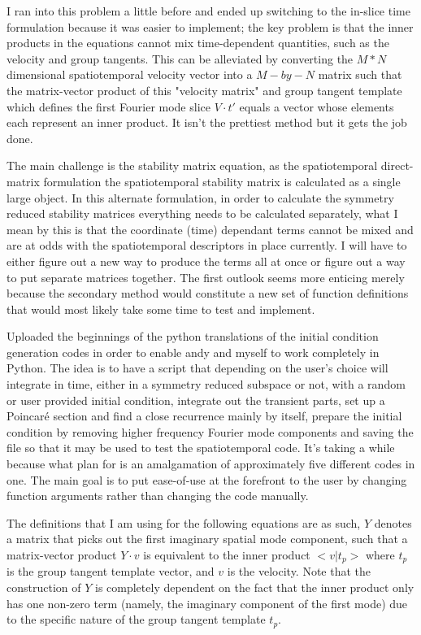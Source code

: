 I ran into this problem a little before and ended up switching to the in-slice time formulation
because it was easier to implement; the key problem is that the inner products in the equations
cannot mix time-dependent quantities, such as the velocity and group tangents. This can be
alleviated by converting the $M*N$ dimensional spatiotemporal velocity vector into a $M-by-N$ matrix
such that the matrix-vector product of this "velocity matrix" and group tangent template which
defines the first Fourier mode slice $V \cdot t'$ equals a vector whose elements each represent an
inner product. It isn't the prettiest method but it gets the job done.

The main challenge is the stability matrix equation, as the spatiotemporal direct-matrix formulation
the spatiotemporal stability matrix is calculated as a single large object. In this alternate formulation,
in order to calculate the symmetry reduced stability matrices everything needs to be calculated separately,
what I mean by this is that the coordinate (time) dependant terms cannot be mixed and are at odds with
the spatiotemporal descriptors in place currently. I will have to either figure out a new way to produce
the terms all at once or figure out a way to put separate matrices together. The first outlook seems
more enticing merely because the secondary method would constitute a new set of function definitions
that would most likely take some time to test and implement.

Uploaded the beginnings of the python translations of the initial condition generation codes in order
to enable andy and myself to work completely in Python. The idea is to have a script that depending
on the user's choice will integrate in time, either in a symmetry reduced
subspace or not, with a random or user provided initial condition, integrate out the transient parts,
set up a Poincar\'e section and find a close recurrence mainly by itself, prepare the initial condition
by removing higher frequency Fourier mode components and saving the file so that it may be used
to test the spatiotemporal code. It's taking a while because what plan for is an amalgamation of
approximately five different codes in one. The main goal is to put ease-of-use at the forefront
to the user by changing function arguments rather than changing the code manually.

The definitions that I am using for the following equations are as such,
$Y$ denotes a matrix that picks out the first imaginary spatial mode component,
such that a matrix-vector product $Y \cdot v$ is equivalent to the inner product
$< v | t_p >$ where $t_p$ is the group tangent template vector, and $v$ is the
velocity. Note that the construction of $Y$ is completely dependent on the fact
that the inner product only has one non-zero term (namely, the imaginary component
of the first mode) due to the specific nature of the group tangent template $t_p$.

